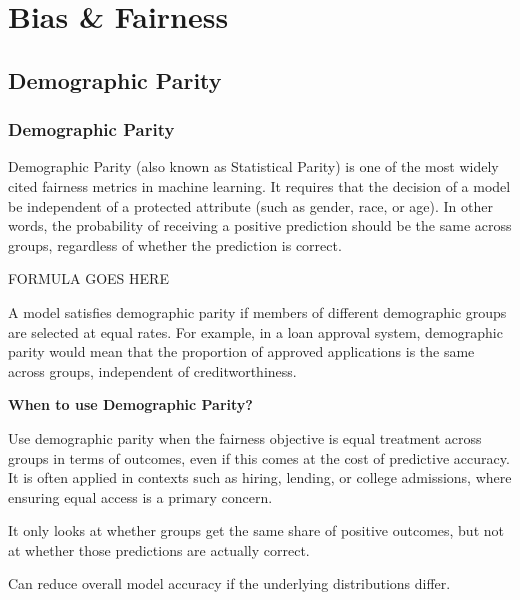\chapter{Bias \& Fairness}


\clearpage
\thispagestyle{biasfairnesstyle}
\section{Demographic Parity}
\subsection{Demographic Parity}


Demographic Parity (also known as Statistical Parity) is one of the most widely cited fairness metrics in machine learning.
It requires that the decision of a model be independent of a protected attribute (such as gender, race, or age). In other words,
the probability of receiving a positive prediction should be the same across groups, regardless of whether the prediction is correct.

\begin{center}
    FORMULA GOES HERE
\end{center}

A model satisfies demographic parity if members of different demographic groups are selected at equal rates. For example, in a loan approval
system, demographic parity would mean that the proportion of approved applications is the same across groups, independent of creditworthiness.

\textbf{When to use Demographic Parity?}

Use demographic parity when the fairness objective is equal treatment across groups in terms of outcomes, even if this comes at the cost
of predictive accuracy. It is often applied in contexts such as hiring, lending, or college admissions, where ensuring equal access is a
primary concern.

{
\item It only looks at whether groups get the same share of positive outcomes, but not at whether those predictions are actually correct.
\item Can reduce overall model accuracy if the underlying distributions differ.
}

